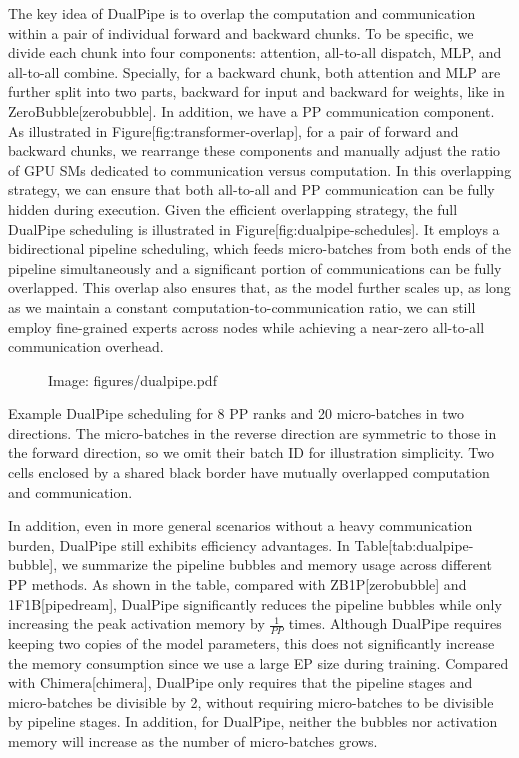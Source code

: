 \documentclass[11pt,a4paper]{article}
\begin{document}
The key idea of DualPipe is to overlap the computation and communication within a pair of individual forward and backward chunks.
To be specific, we divide each chunk into four components: attention, all-to-all dispatch, MLP, and all-to-all combine. 
Specially, for a backward chunk, both attention and MLP are further split into two parts, backward for input and backward for weights, like in ZeroBubble[zerobubble]. 
In addition, we have a PP communication component. 
As illustrated in Figure[fig:transformer-overlap], for a pair of forward and backward chunks, we rearrange these components and manually adjust the ratio of GPU SMs dedicated to communication versus computation. 
In this overlapping strategy, we can ensure that both all-to-all and PP communication can be fully hidden during execution. 
Given the efficient overlapping strategy, the full DualPipe scheduling is illustrated in Figure[fig:dualpipe-schedules]. 
It employs a bidirectional pipeline scheduling, which feeds micro-batches from both ends of the pipeline simultaneously and a significant portion of communications can be fully overlapped.
This overlap also ensures that, as the model further scales up, as long as we maintain a constant computation-to-communication ratio, we can still employ fine-grained experts across nodes while achieving a near-zero all-to-all communication overhead.

\begin{figure}[h]
\caption{Image: figures/dualpipe.pdf}
\end{figure}

Example DualPipe scheduling for 8 PP ranks and 20 micro-batches in two directions. 
 The micro-batches in the reverse direction are symmetric to those in the forward direction, so we omit their batch ID for illustration simplicity. 
 Two cells enclosed by a shared black border have mutually overlapped computation and communication.

In addition, even in more general scenarios without a heavy communication burden, DualPipe still exhibits efficiency advantages. 
In Table[tab:dualpipe-bubble], we summarize the pipeline bubbles and memory usage across different PP methods. 
As shown in the table, compared with ZB1P[zerobubble] and 1F1B[pipedream], DualPipe significantly reduces the pipeline bubbles while only increasing the peak activation memory by $\frac{1}{PP}$ times.
Although DualPipe requires keeping two copies of the model parameters, this does not significantly increase the memory consumption since we use a large EP size during training. 
Compared with Chimera[chimera], DualPipe only requires that the pipeline stages and micro-batches be divisible by 2, without requiring micro-batches to be divisible by pipeline stages.
In addition, for DualPipe, neither the bubbles nor activation memory will increase as the number of micro-batches grows.
\end{document}

